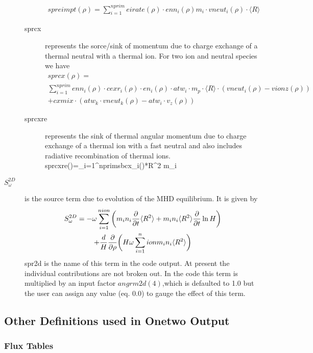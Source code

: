\begin{description}
\begin{description}
\begin{multline}
   spreimpt(\rho)=\sum_{i=1}^{nprim}eirate(\rho)\cdot enn_i(\rho)
   m_i\cdot vneut_i(\rho)\cdot\langle R\rangle \label{eq:spreimpt}
  \end{multline}
  \item[sprcx] represents the sorce/sink of momentum due to charge exchange of a
  thermal neutral with a thermal ion. For two ion and neutral species we have
  \begin{multline}
   sprcx(\rho)=\\ \sum_{i=1}^{nprim}enn_i(\rho)\cdot cexr_i(\rho)\cdot
   en_i(\rho)\cdot atw_i\cdot m_p\cdot\langle R\rangle \cdot(vneut_i(\rho)-vionz(\rho))\\
   +cxmix\cdot(atw_k\cdot vneut_k(\rho)-atw_i\cdot v_z(\rho))
  \end{multline}
  \item[sprcxre] represents the sink of thermal angular momentum due to charge
  exchange of a thermal ion with a fast neutral and also includes radiative
  recombination of thermal ions.
  \beq
   sprcxre(\rho)=\sum_{i=1}^{nprim}sbcx_i(\rho)*\langle R^2\rangle
   \omega m_i  \label{eq:sprcxre}
  \eeq
 \end{description} %
 \item[$S_\omega^{2D}$] is the source term due to evolution of the MHD
 equilibrium. It is given by
 \begin{multline}
  S_\omega^{2D}=-\omega\sum_{i=1}^{nion}\bigg( m_in_i\frac{\partial}{\partial t}\langle R^2\rangle
  +m_in_i\langle R^2\rangle\frac{\partial}{\partial t}\ln H \bigg )\\
  +\frac{d}{H}\frac{\partial}{\partial \rho}\bigg(
  H\omega\sum_{i=1}^nion m_in_i\langle R^2\rangle \bigg )
 \end{multline}
 spr2d  is the name of this term in the code output. At present the individual
 contributions are not broken out. In the code this term  is multiplied by an
 input factor $angrm2d(4)$,which is defaulted to 1.0 but the user can assign any
 value (eq. 0.0) to gauge the effect of this term.
\end{description}

\subsection{Other Definitions used in Onetwo Output}

\subsubsection{Flux Tables}

